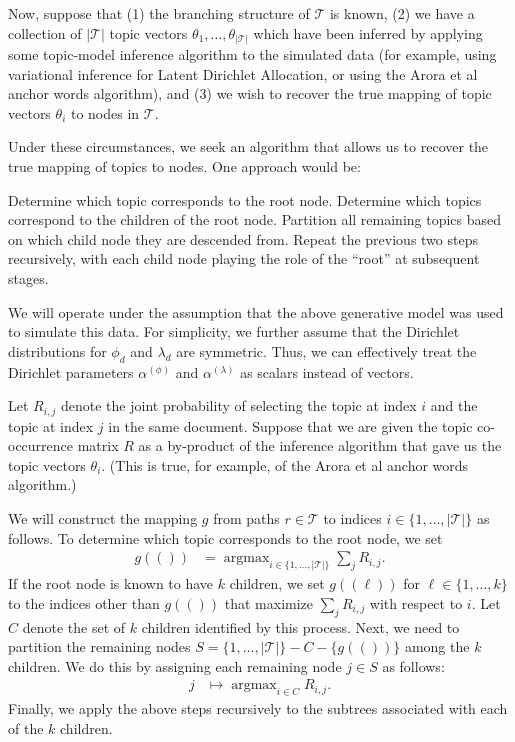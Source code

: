 \documentclass{article}
\newcommand{\argmax}{\mathop{\mathrm{argmax}}}
\begin{document}
Now, suppose that (1) the branching structure of $\mathcal T$ is known,
(2) we have a collection of $|\mathcal T|$ topic vectors $\theta_1, \ldots, \theta_{|\mathcal T|}$ which have been inferred by applying some topic-model inference algorithm to the simulated data (for example, using variational inference for Latent Dirichlet Allocation, or using the Arora et al anchor words algorithm), and
(3) we wish to recover the true mapping of topic vectors $\theta_i$ to nodes in $\mathcal T$.

Under these circumstances, we seek an algorithm that allows us to recover the true mapping of topics to nodes.
One approach would be:
\begin{outline}
\1 Determine which topic corresponds to the root node.
\1 Determine which topics correspond to the children of the root node.
\1 Partition all remaining topics based on which child node they are descended from.
\1 Repeat the previous two steps recursively, with each child node playing the role of the ``root'' at subsequent stages.
\end{outline}

We will operate under the assumption that the above generative model was used to simulate this data.
For simplicity, we further assume that the Dirichlet distributions for $\phi_d$ and $\lambda_d$ are symmetric.
Thus, we can effectively treat the Dirichlet parameters $\alpha^{(\phi)}$ and $\alpha^{(\lambda)}$ as scalars instead of vectors.

Let $R_{i,j}$ denote the joint probability of selecting the topic at index $i$ and the topic at index $j$ in the same document.
Suppose that we are given the topic co-occurrence matrix $R$ as a by-product of the inference algorithm that gave us the topic vectors $\theta_i$.
(This is true, for example, of the Arora et al anchor words algorithm.)

We will construct the mapping $g$ from paths $r \in \mathcal T$ to indices $i \in \{1, \ldots, |\mathcal T|\}$ as follows.
To determine which topic corresponds to the root node, we set
\begin{align}
g(()) &= \argmax_{i \in \{1, \ldots, |\mathcal T|\}} \sum_j R_{i,j}.
\end{align}
If the root node is known to have $k$ children, we set $g((\ell))$ for $\ell \in \{1, \ldots, k\}$ to the indices other than $g(())$ that maximize $\sum_j R_{i,j}$ with respect to $i$.
Let $C$ denote the set of $k$ children identified by this process.
Next, we need to partition the remaining nodes $S = \{1, \ldots, |\mathcal T|\} - C - \{g(())\}$ among the $k$ children.
We do this by assigning each remaining node $j \in S$ as follows:
\begin{align}
j &\mapsto \argmax_{i \in C} R_{i, j}.
\label{eqn:partitionRule}
\end{align}
Finally, we apply the above steps recursively to the subtrees associated with each of the $k$ children.
\end{document}
